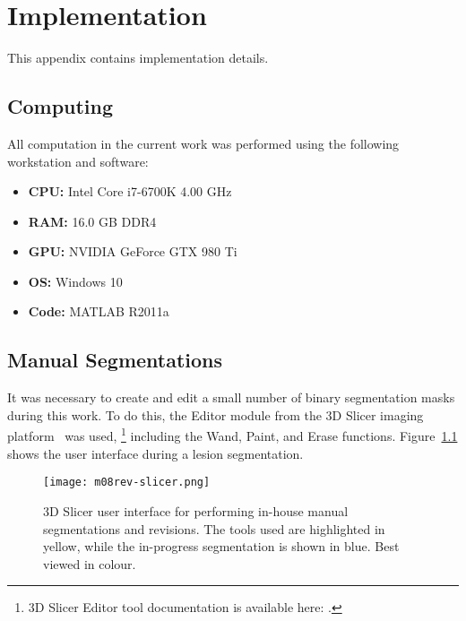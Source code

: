 \chapter{Implementation}
This appendix contains implementation details.
\section{Computing}
All computation in the current work was performed using the following workstation and software:
\begin{itemize}[topsep=0pt,itemsep=-6pt]
  \item \textbf{CPU:} Intel Core i7-6700K 4.00 GHz
  \item \textbf{RAM:} 16.0 GB DDR4
  \item \textbf{GPU:} NVIDIA GeForce GTX 980 Ti
  \item \textbf{OS:} Windows 10
  \item \textbf{Code:} MATLAB R2011a
\end{itemize}
\section{Manual Segmentations}
It was necessary to create and edit a small number of binary segmentation masks during this work.
To do this, the Editor module from the 3D Slicer imaging platform~\cite{Fedorov2012} was used,%
\footnote{3D Slicer Editor tool documentation is available here:
  .}
including the Wand, Paint, and Erase functions.
Figure~\ref{fig:m08-rev-slicer} shows the user interface during a lesion segmentation.
\begin{figure}[h]
  \centering
  \texttt{[image: m08rev-slicer.png]}
  \caption{3D Slicer user interface for performing in-house manual segmentations and revisions.
    The tools used are highlighted in yellow, while the in-progress segmentation is shown in blue.
    Best viewed in colour.}%
  \label{fig:m08-rev-slicer}
\end{figure}
